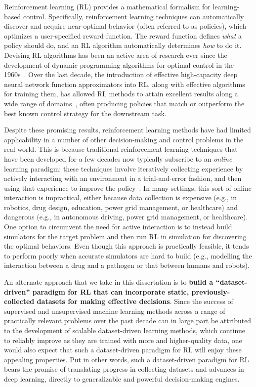 \documentclass[../thesis.tex]{subfiles}
\begin{document}
Reinforcement learning (RL) provides a mathematical formalism for learning-based control. Specifically, reinforcement learning techniques can automatically discover and acquire near-optimal behavior (often referred to as policies), which optimizes a user-specified reward function. The reward function defines \emph{what} a policy should do, and an RL algorithm automatically determines \emph{how} to do it. Devising RL algorithms has been an active area of research ever since the development of dynamic programming algorithms for optimal control in the 1960s~\citep{bellman1966dynamic}. Over the last decade, the introduction of effective high-capacity deep neural network function approximators into RL, along with effective algorithms for training them, has allowed RL methods to attain excellent results along a wide range of domains~\citep{tesauro1994td,levine2013guided,mnih2013playing,levine2016end,silver2017mastering,kalashnikov2018qtopt}, often producing policies that match or outperform the best known control strategy for the downstream task. 

Despite these promising results, reinforcement learning methods have had limited applicability in a number of other decision-making and control problems in the real world. This is because traditional reinforcement learning techniques that have been developed for a few decades now typically subscribe to an \emph{online} learning paradigm: these techniques involve iteratively collecting experience by actively interacting with an environment in a trial-and-error fashion, and then using that experience to improve the policy~\citep{sb-irl-98}. In many settings, this sort of online interaction is impractical, either because data collection is expensive (e.g., in robotics, drug design, education, power grid management, or healthcare) and dangerous (e.g., in autonomous driving, power grid management, or healthcare). One option to circumvent the need for active interaction is to instead build simulators for the target problem and then run RL in simulation for discovering the optimal behaviors. Even though this approach is practically feasible, it tends to perform poorly when accurate simulators are hard to build (e.g., modelling the interaction between a drug and a pathogen or that between humans and robots).

An alternate approach that we take in this dissertation is to \textbf{build a ``dataset-driven'' paradigm for RL that can incorporate static, previously-collected datasets for making effective decisions}. Since the success of supervised and unsupervised machine learning methods across a range of practically relevant problems over the past decade can in large part be attributed to the development of scalable dataset-driven learning methods, which continue to reliably improve as they are trained with more and higher-quality data, one would also expect that such a dataset-driven paradigm for RL will enjoy these appealing properties. Put in other words, such a dataset-driven paradigm for RL bears the promise of translating progress in collecting datasets and advances in deep learning, directly to generalizable and powerful decision-making engines. 
\end{document}
